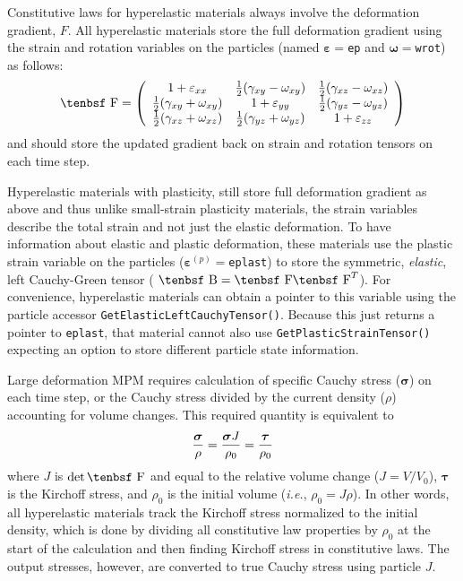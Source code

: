 \documentclass[11pt]{article}
\renewcommand{\vec}[1]{\boldsymbol{#1}}
\def\B{\hbox{\tenbsf B}}
\def\e#1{\varepsilon_{#1}}
\def\ee{\varepsilon}
\def\F{\hbox{\tenbsf F}}
\def\g#1{\gamma_{#1}}
\def\w#1{\omega_{#1}}
\begin{document}
Constitutive laws for hyperelastic materials always involve the deformation gradient, $F$. All hyperelastic materials store the full deformation gradient using the strain and rotation variables on the particles (named $\vec\ee=${\tt ep} and $\vec\omega=${\tt wrot}) as follows:
\begin{equation}
   \F = \left(\begin{array}{ccc}
          1 + \e{xx} & {1\over2}(\g{xy}-\w{xy}) & {1\over2}(\g{xz}-\w{xz})   \\
         {1\over2}(\g{xy}+\w{xy})  & 1 + \e{yy} & {1\over2}(\g{yz}-\w{yz})   \\
        {1\over2}(\g{xz}+\w{xz}) & {1\over2}(\g{yz}+\w{yz}) & 1 + \e{zz}
        \end{array}\right)
\end{equation}
and should store the updated gradient back on strain and rotation tensors on each time step.

Hyperelastic materials with plasticity, still store full deformation gradient as above and thus unlike small-strain plasticity materials, the strain variables describe the total strain and not just the elastic deformation. To have information about elastic and plastic deformation, these materials use the plastic strain variable on the particles ($\vec\ee^{(p)}=${\tt eplast}) to store the symmetric, {\em elastic}, left Cauchy-Green tensor ( $\B = \F\F^T$). For convenience, hyperelastic materials can obtain a pointer to this variable using the particle accessor {\tt GetElasticLeftCauchyTensor()}. Because this just returns a pointer to {\tt eplast}, that material cannot also use {\tt GetPlasticStrainTensor()} expecting an option to store different particle state information.

Large deformation MPM requires calculation of specific Cauchy stress ($\vec\sigma$) on each time step, or the Cauchy stress divided by the current density ($\rho$) accounting for volume changes. This required quantity is equivalent to
\begin{equation}
              {\vec\sigma\over\rho} = {\vec\sigma J\over\rho_0} =  {\vec\tau\over\rho_0}
\end{equation}
where $J$ is $\det \F$ and equal to the relative volume change ($J = V/V_0$), $\vec\tau$ is the Kirchoff stress, and $\rho_0$ is the initial volume ({\em i.e.}, $\rho_0 = J\rho$). In other words, all hyperelastic materials track the Kirchoff stress normalized to the initial density, which is done by dividing all constitutive law properties by $\rho_0$ at the start of the calculation and then finding Kirchoff stress in constitutive laws. The output stresses, however, are converted to true Cauchy stress using particle $J$.
\end{document}
